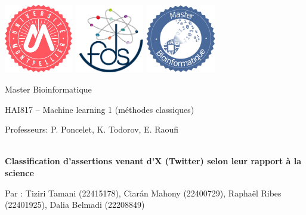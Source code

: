 \documentclass[leqno]{article}[12pt]
\begin{document}
    \onehalfspace

    \begin{titlepage}
        \begin{center}
            \includegraphics[height=3cm]{images/logo_UM}\hspace{0.2\textwidth}
            \includegraphics[height=3cm]{images/logo_fds_rond}\hspace{0.2\textwidth}
            \includegraphics[height=3cm]{images/Logo_Bioinfo}

            {\Huge Master Bioinformatique\\[1cm]}

            {\large HAI817 -- Machine learning 1 (méthodes classiques)}\\[0.7cm]

            \begin{center}
                \large{Professeurs: P. Poncelet, K. Todorov, E. Raoufi}
            \end{center}

            \vspace{2.5cm}

            \hrulefill\\[0.4cm]
            {\fontsize{18}{22}\textbf{Classification d'assertions venant d’X (Twitter) selon leur rapport à la science}}\\[0.4cm]
            \hrulefill

            \vspace{1cm}
            {\large Par : Tiziri Tamani (22415178), Ciarán Mahony (22400729), Raphaël Ribes (22401925), Dalia Belmadi (22208849)}


\end{center}
\end{titlepage}
\end{document}
